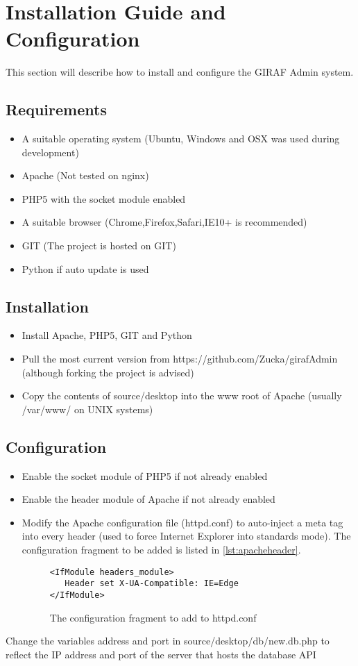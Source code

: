 \section{Installation Guide and Configuration}
This section will describe how to install and configure the GIRAF Admin system. 
\subsection{Requirements}
\begin{itemize}
\item A suitable operating system (Ubuntu, Windows and OSX was used during development)
\item Apache (Not tested on nginx)
\item PHP5 with the socket module enabled
\item A suitable browser (Chrome,Firefox,Safari,IE10+ is recommended)
\item GIT (The project is hosted on GIT)
\item Python if auto update is used
\end{itemize}
\subsection{Installation}
\begin{itemize}
\item Install Apache, PHP5, GIT and Python
\item Pull the most current version from https://github.com/Zucka/girafAdmin (although forking the project is advised)
\item Copy the contents of source/desktop into the www root of Apache (usually /var/www/ on UNIX systems)
\end{itemize}
\subsection{Configuration}
\begin{itemize}
\item Enable the socket module of PHP5 if not already enabled
\item Enable the header module of Apache if not already enabled
\item Modify the Apache configuration file (httpd.conf) to auto-inject a meta tag into every header (used to force Internet Explorer into standards mode). The configuration fragment to be added is listed in \autoref{lst:apacheheader}. 
\begin{figure}[htbp]
\begin{lstlisting}
<IfModule headers_module>
   Header set X-UA-Compatible: IE=Edge
</IfModule>
\end{lstlisting}
\caption{The configuration fragment to add to httpd.conf}
\label{lst:apacheheader}
\end{figure}
\end{itemize}
\item Change the variables address and port in source/desktop/db/new.db.php to reflect the IP address and port of the server that hosts the database API
